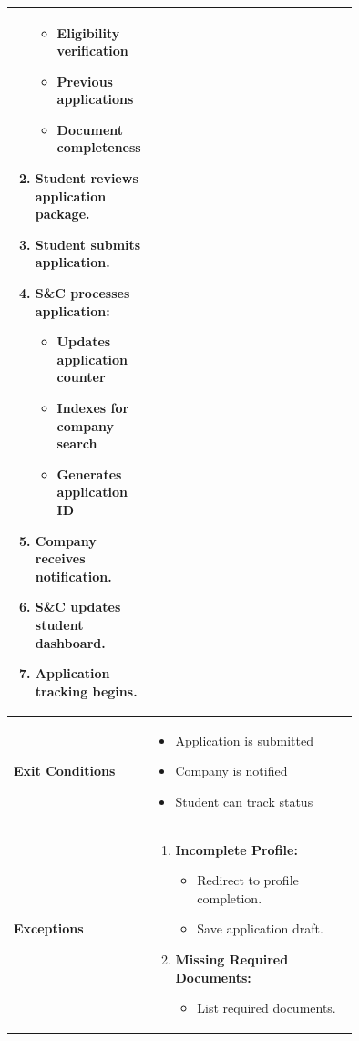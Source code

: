 \begin{center}
\begin{longtable}{|l|p{0.75\linewidth}|}
\begin{enumerate}
            \begin{itemize}
                \item Eligibility verification
                \item Previous applications
                \item Document completeness
            \end{itemize}
            \item Student reviews application package.
            \item Student submits application.
            \item S\&C processes application:
            \begin{itemize}
                \item Updates application counter
                \item Indexes for company search
                \item Generates application ID
            \end{itemize}
            \item Company receives notification.
            \item S\&C updates student dashboard.
            \item Application tracking begins.
        \end{enumerate} \\
        \hline
        \textbf{Exit Conditions}   & 
        \begin{itemize}
            \item Application is submitted
            \item Company is notified
            \item Student can track status
        \end{itemize} \\
        \hline
        \textbf{Exceptions}       & 
        \begin{enumerate}
            \item \textbf{Incomplete Profile:} 
            \begin{itemize}
                \item Redirect to profile completion.
                \item Save application draft.
            \end{itemize} 
            \item \textbf{Missing Required Documents:} \begin{itemize}
                \item List required documents.

\end{itemize}
\end{enumerate}
\end{longtable}
\end{center}
